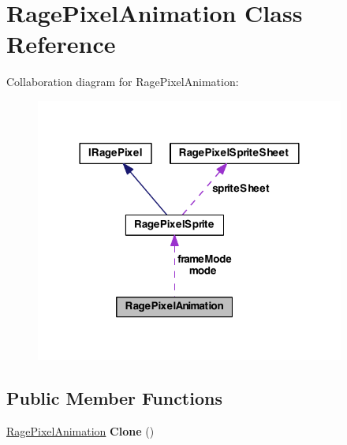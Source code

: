 \hypertarget{class_rage_pixel_animation}{\section{Rage\-Pixel\-Animation Class Reference}
\label{class_rage_pixel_animation}
}


Collaboration diagram for Rage\-Pixel\-Animation\-:
\nopagebreak
\begin{figure}[H]
\begin{center}
\leavevmode
\includegraphics[width=288pt]{class_rage_pixel_animation__coll__graph}
\end{center}
\end{figure}
\subsection*{Public Member Functions}
\begin{DoxyCompactItemize}
\item 
\hypertarget{class_rage_pixel_animation_a71e2dff56a081d5e88439e6484831aab}{\hyperlink{class_rage_pixel_animation}{Rage\-Pixel\-Animation} {\bfseries Clone} ()}\label{class_rage_pixel_animation_a71e2dff56a081d5e88439e6484831aab}

\end{DoxyCompactItemize}

